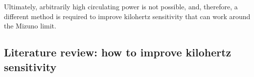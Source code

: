 Ultimately, arbitrarily high circulating power is not possible, and, therefore, a different method is required to improve kilohertz sensitivity that can work around the Mizuno limit.




\subsection{Literature review: how to improve kilohertz sensitivity}
\label{sec:intro_literature_review}

